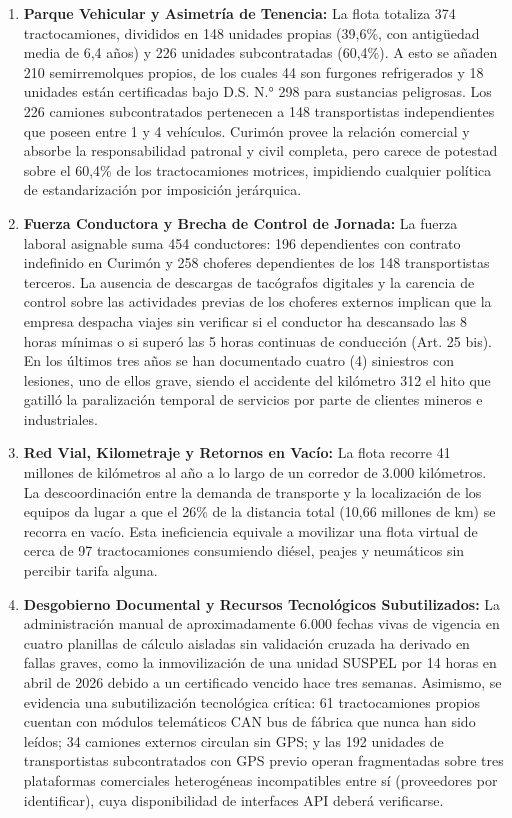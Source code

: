 \begin{enumerate}
  \item \textbf{Parque Vehicular y Asimetría de Tenencia:} La flota totaliza 374 tractocamiones, divididos en 148 unidades propias (39,6\%, con antigüedad media de 6,4 años) y 226 unidades subcontratadas (60,4\%). A esto se añaden 210 semirremolques propios, de los cuales 44 son furgones refrigerados y 18 unidades están certificadas bajo D.S. N.° 298 para sustancias peligrosas. Los 226 camiones subcontratados pertenecen a 148 transportistas independientes que poseen entre 1 y 4 vehículos. Curimón provee la relación comercial y absorbe la responsabilidad patronal y civil completa, pero carece de potestad sobre el 60,4\% de los tractocamiones motrices, impidiendo cualquier política de estandarización por imposición jerárquica.
  \item \textbf{Fuerza Conductora y Brecha de Control de Jornada:} La fuerza laboral asignable suma 454 conductores: 196 dependientes con contrato indefinido en Curimón y 258 choferes dependientes de los 148 transportistas terceros. La ausencia de descargas de tacógrafos digitales y la carencia de control sobre las actividades previas de los choferes externos implican que la empresa despacha viajes sin verificar si el conductor ha descansado las 8 horas mínimas o si superó las 5 horas continuas de conducción (Art. 25 bis). En los últimos tres años se han documentado cuatro (4) siniestros con lesiones, uno de ellos grave, siendo el accidente del kilómetro 312 el hito que gatilló la paralización temporal de servicios por parte de clientes mineros e industriales.
  \item \textbf{Red Vial, Kilometraje y Retornos en Vacío:} La flota recorre 41 millones de kilómetros al año a lo largo de un corredor de 3.000 kilómetros. La descoordinación entre la demanda de transporte y la localización de los equipos da lugar a que el 26\% de la distancia total (10,66 millones de km) se recorra en vacío. Esta ineficiencia equivale a movilizar una flota virtual de cerca de 97 tractocamiones consumiendo diésel, peajes y neumáticos sin percibir tarifa alguna.
  \item \textbf{Desgobierno Documental y Recursos Tecnológicos Subutilizados:} La administración manual de aproximadamente 6.000 fechas vivas de vigencia en cuatro planillas de cálculo aisladas sin validación cruzada ha derivado en fallas graves, como la inmovilización de una unidad SUSPEL por 14 horas en abril de 2026 debido a un certificado vencido hace tres semanas. Asimismo, se evidencia una subutilización tecnológica crítica: 61 tractocamiones propios cuentan con módulos telemáticos CAN bus de fábrica que nunca han sido leídos; 34 camiones externos circulan sin GPS; y las 192 unidades de transportistas subcontratados con GPS previo operan fragmentadas sobre tres plataformas comerciales heterogéneas incompatibles entre sí (proveedores por identificar), cuya disponibilidad de interfaces API deberá verificarse.

\end{enumerate}
